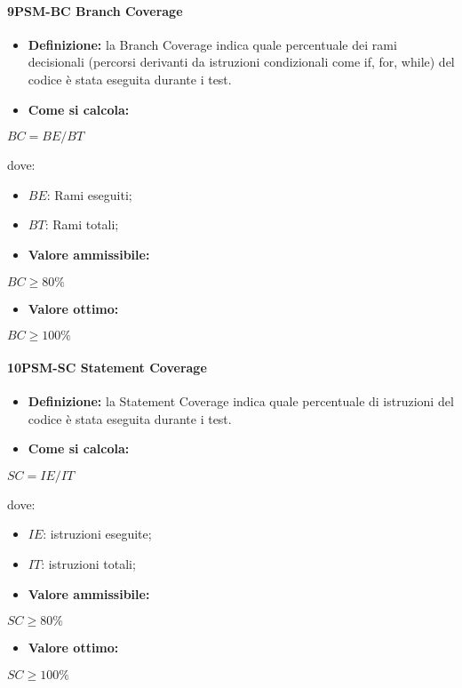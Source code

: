 \paragraph*{9PSM-BC Branch Coverage}
\begin{itemize}
    \item \textbf{Definizione:} la Branch Coverage indica quale percentuale dei rami decisionali (percorsi derivanti da istruzioni condizionali come if, for, while) del codice è stata eseguita durante i test.
    \item \textbf{Come si calcola:}
\end{itemize}
\begin{center}
    $BC = BE/BT$ 
 \end{center}
 dove:
 \begin{itemize}[label=$\rightarrow$]
     \item $BE$: Rami eseguiti;
     \item $BT$: Rami totali;
 \end{itemize}
\begin{itemize}
    \item \textbf{Valore ammissibile:}
\end{itemize}
\begin{center}
    $BC \geq 80\%$
\end{center}
\begin{itemize}
    \item \textbf{Valore ottimo:}
\end{itemize}
\begin{center}
    $BC \geq 100\%$
\end{center}

\paragraph*{10PSM-SC Statement Coverage}
\begin{itemize}
    \item \textbf{Definizione:} la Statement Coverage indica quale percentuale di istruzioni del codice è stata eseguita durante i test.
    \item \textbf{Come si calcola:}
\end{itemize}
\begin{center}
    $SC = IE/IT$ 
 \end{center}
 dove:
 \begin{itemize}[label=$\rightarrow$]
     \item $IE$: istruzioni eseguite;
     \item $IT$: istruzioni totali;
 \end{itemize}
\begin{itemize}
    \item \textbf{Valore ammissibile:}
\end{itemize}
\begin{center}
    $SC \geq 80\%$
\end{center}
\begin{itemize}
    \item \textbf{Valore ottimo:}
\end{itemize}
\begin{center}
    $SC \geq 100\%$
\end{center}

